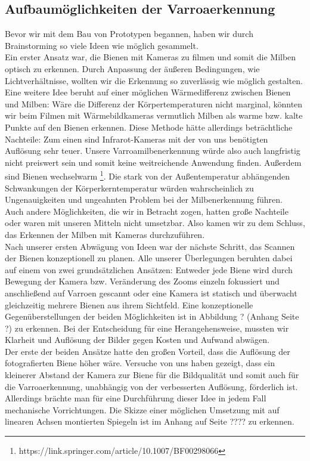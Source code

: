 \documentclass[11pt,a4paper]{article}
\begin{document}
\subsection{Aufbaumöglichkeiten der Varroaerkennung}
Bevor wir mit dem Bau von Prototypen begannen, haben wir durch Brainstorming so viele Ideen wie möglich gesammelt.\\
Ein erster Ansatz war, die Bienen mit Kameras zu filmen und somit die Milben optisch zu erkennen. Durch Anpassung der äußeren Bedingungen, wie Lichtverhältnisse, wollten wir die Erkennung so zuverlässig wie möglich gestalten.\\
Eine weitere Idee beruht auf einer möglichen Wärmedifferenz zwischen Bienen und Milben: Wäre die Differenz der Körpertemperaturen nicht marginal, könnten wir beim Filmen mit Wärmebildkameras vermutlich Milben als warme bzw. kalte Punkte auf den Bienen erkennen. Diese Methode hätte allerdings beträchtliche Nachteile: Zum einen sind Infrarot-Kameras mit der von uns benötigten Auflösung sehr teuer. Unsere Varroamilbenerkennung würde also auch langfristig nicht preiswert sein und somit keine weitreichende Anwendung finden. Außerdem sind Bienen wechselwarm \footnote{https://link.springer.com/article/10.1007/BF00298066}. Die stark von der Außentemperatur abhängenden Schwankungen der Körperkerntemperatur würden wahrscheinlich zu Ungenauigkeiten und ungeahnten Problem bei der Milbenerkennung führen.\\
Auch andere Möglichkeiten, die wir in Betracht zogen, hatten große Nachteile oder waren mit unseren Mitteln nicht umsetzbar. Also kamen wir zu dem Schluss, das Erkennen der Milben mit Kameras durchzuführen.\\
Nach unserer ersten Abwägung von Ideen war der nächste Schritt, das Scannen der Bienen konzeptionell zu planen. Alle unserer Überlegungen beruhten dabei auf einem von zwei grundsätzlichen Ansätzen: Entweder jede Biene wird durch Bewegung der Kamera bzw. Veränderung des Zooms einzeln fokussiert und anschließend auf Varroen gescannt oder eine Kamera ist statisch und überwacht gleichzeitig mehrere Bienen aus ihrem Sichtfeld. Eine konzeptionelle Gegenüberstellungen der beiden Möglichkeiten ist in Abbildung ? (Anhang Seite ?) zu erkennen. Bei der Entscheidung für eine Herangehensweise, mussten wir Klarheit und Auflösung der Bilder gegen Kosten und Aufwand abwägen.\\
Der erste der beiden Ansätze hatte den großen Vorteil, dass die Auflösung der fotografierten Biene höher wäre. Versuche von uns haben gezeigt, dass ein kleinerer Abstand der Kamera zur Biene für die Bildqualität und somit auch für die Varroaerkennung, unabhängig von der verbesserten Auflösung, förderlich ist. Allerdings brächte man für eine Durchführung dieser Idee in jedem Fall mechanische Vorrichtungen. Die Skizze einer möglichen Umsetzung mit auf linearen Achsen montierten Spiegeln ist im Anhang auf Seite ???? zu erkennen.\\
\end{document}
